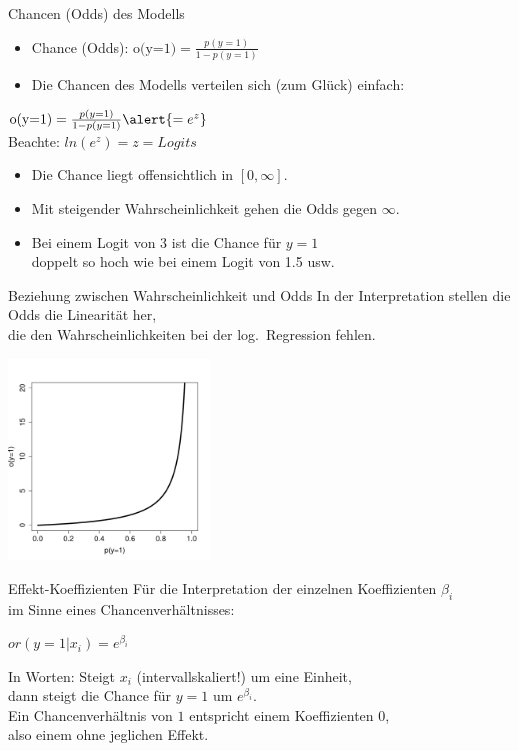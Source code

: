 \begin{frame}
  {Chancen (Odds) des Modells}
  \begin{itemize}[<+->]
    \item Chance (Odds): $\text{o(y=1)} = \frac{p(y=1)}{1-p(y=1)}$
    \item Die Chancen des Modells verteilen sich (zum Glück) einfach:
  \end{itemize}
  \pause
  \begin{center}
    $\text{o(y=1)} = \frac{p(y=1)}{1-p(y=1)}\alert{=e^z}$\\[3ex]
    Beachte: $ln(e^z)=z=Logits$
  \end{center}
  \pause
  \begin{itemize}[<+->]
    \item Die Chance liegt offensichtlich in $[0, \infty]$.
    \item Mit steigender Wahrscheinlichkeit gehen die Odds gegen $\infty$.
    \item Bei einem Logit von 3 ist die Chance für $y=1$\\
      doppelt so hoch wie bei einem Logit von 1.5 usw.
  \end{itemize}
\end{frame}

\begin{frame}
  {Beziehung zwischen Wahrscheinlichkeit und Odds}
  In der Interpretation stellen die Odds die Linearität her,\\
  die den Wahrscheinlichkeiten bei der log.\ Regression fehlen.
  \begin{center}
    \includegraphics[width=0.4\textwidth]{graphics/odds}
  \end{center}
\end{frame}

\begin{frame}
  {Effekt-Koeffizienten}
  Für die Interpretation der einzelnen Koeffizienten $\beta_i$\\
  im Sinne eines Chancenverhältnisses:
  \begin{center}
    \alert{$or(y=1|x_i)=e^{\beta_i}$}
  \end{center}
  \pause
  In Worten: Steigt $x_i$ (intervallskaliert!) um eine Einheit,\\
  dann steigt die Chance für $y=1$ um $e^{\beta_i}$.\\
  \vspace{0.5cm}
  \pause
  Ein Chancenverhältnis von $1$ entspricht einem Koeffizienten $0$,\\
  also einem ohne jeglichen Effekt.
\end{frame}

